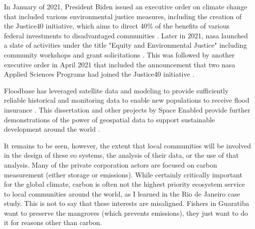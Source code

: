 In January of 2021, President Biden issued an executive order on climate change that included various environmental justice measures, including the creation of the Justice40 initiative, which aims to direct 40\% of the benefits of various federal investments to disadvantaged communities \cite{bidenExecutiveOrderTackling2021}. Later in 2021, \ac{nasa} launched a slate of activities under the title "Equity and Environmental Justice" including community workshops and grant solicitations \cite{bollesEquityEnvironmentalJustice2021}. This was followed by another executive order in April 2021 that included the announcement that two \ac{nasa} Applied Sciences Programs had joined the Justice40 initiative \cite{bidenExecutiveOrderRevitalizing2023, Justice40InitiativeCovered2023}. 

Floodbase has leveraged satellite data and modeling to provide sufficiently reliable historical and monitoring data to enable new populations to receive flood insurance \cite{tellmanRegionalIndexInsurance2022}. This dissertation and other projects by Space Enabled provide further demonstrations of the power of geospatial data to support sustainable development around the world \cite{lombardoDevelopmentDecisionSupport2021, lombardoEnvironmentVulnerabilityDecisionTechnologyFrameworkDecision2022, ovienmhadaInclusiveDesignEarth2021, ovienmhadaEnvironmentVulnerabilityDecisionTechnologyModelingFramework2021}. 

It remains to be seen, however, the extent that local communities will be involved in the design of these \ac{eo} systems, the analysis of their data, or the use of that analysis. Many of the private corporation actors are focused on carbon measurement (either storage or emissions). While certainly critically important for the global climate, carbon is often not the highest priority ecosystem service to local communities around the world, as I learned in the Rio de Janeiro case study. This is not to say that these interests are misaligned. Fishers in Guaratiba want to preserve the mangroves (which prevents emissions), they just want to do it for reasons other than carbon. 

